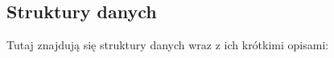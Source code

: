 \subsection{Struktury danych}
Tutaj znajdują się struktury danych wraz z ich krótkimi opisami\+:\begin{DoxyCompactList}
\item{}
\item{}
\item{}
\end{DoxyCompactList}
